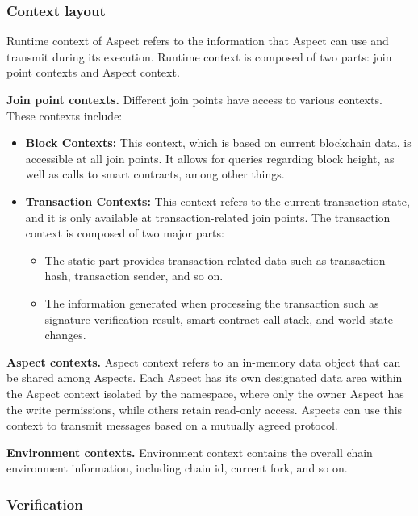 \subsubsection{Context layout}

Runtime context of Aspect refers to the information that Aspect can use and transmit during its execution. Runtime context is composed of two parts: join point contexts and Aspect context.

\textbf{Join point contexts.} Different join points have access to various contexts. These contexts include:

\begin{itemize}
  \item \textbf{Block Contexts:} This context, which is based on current blockchain data, is accessible at all join points. It allows for queries regarding block height, as well as calls to smart contracts, among other things.
  \item \textbf{Transaction Contexts:} This context refers to the current transaction state, and it is only available at transaction-related join points. The transaction context is composed of two major parts:
    \begin{itemize}
      \item The static part provides transaction-related data such as transaction hash, transaction sender, and so on.
      \item The information generated when processing the transaction such as signature verification result, smart contract call stack, and world state changes.
    \end{itemize}
\end{itemize}

\textbf{Aspect contexts.} Aspect context refers to an in-memory data object that can be shared among Aspects. Each Aspect has its own designated data area within the Aspect context isolated by the namespace, where only the owner Aspect has the write permissions, while others retain read-only access. Aspects can use this context to transmit messages based on a mutually agreed protocol. 

\textbf{Environment contexts.} Environment context contains the overall chain environment information, including chain id, current fork, and so on.

\subsubsection{Verification}

